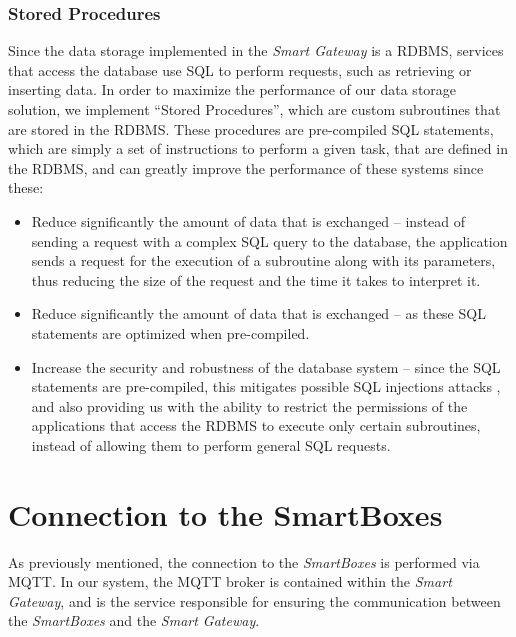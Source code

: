 \subsubsection{Stored Procedures}

Since the data storage implemented in the \textit{Smart Gateway} is a \acs{RDBMS}, services that access the database use \acf{SQL} to perform requests, such as retrieving or inserting data. In order to maximize the performance of our data storage solution, we implement ``Stored Procedures'', which are custom subroutines that are stored in the \acs{RDBMS}. These procedures are pre-compiled \acs{SQL} statements, which are simply a set of instructions to perform a given task, that are defined in the \acs{RDBMS}, and can greatly improve the performance of these systems since these:

\begin{itemize}
    \item Reduce significantly the amount of data that is exchanged -- instead of sending a request with a complex \acs{SQL} query to the database, the application sends a request for the execution of a subroutine along with its parameters, thus reducing the size of the request and the time it takes to interpret it.
    \item Reduce significantly the amount of data that is exchanged -- as these \acs{SQL} statements are optimized when pre-compiled.
    \item Increase the security and robustness of the database system -- since the \acs{SQL} statements are pre-compiled, this mitigates possible \acs{SQL} injections attacks \cite{clarke2012sql}, and also providing us with the ability to restrict the permissions of the applications that access the \acs{RDBMS} to execute only certain subroutines, instead of allowing them to perform general \acs{SQL} requests.
\end{itemize}


\section{Connection to the SmartBoxes}


As previously mentioned, the connection to the \textit{SmartBoxes} is performed via \acs{MQTT}. In our system, the \acs{MQTT} broker is contained within the \textit{Smart Gateway}, and is the service responsible for ensuring the communication between the \textit{SmartBoxes} and the \textit{Smart Gateway}.

